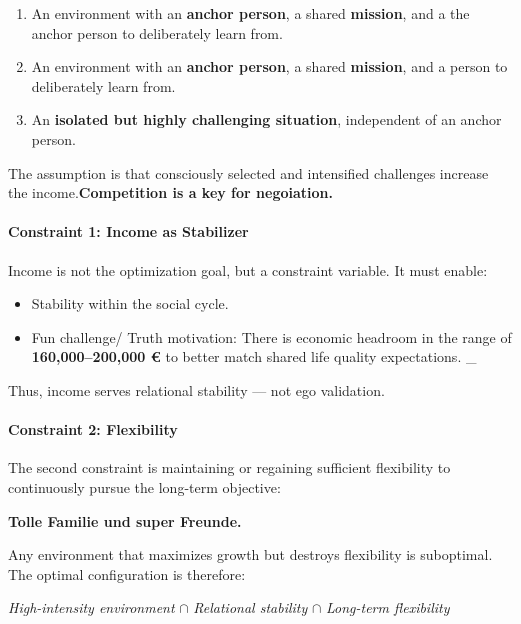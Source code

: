  \begin{enumerate}
 	\item An environment with an \textbf{anchor person}, a shared \textbf{mission}, and a the anchor person to deliberately learn from.
 	\item An environment with an \textbf{anchor person}, a shared \textbf{mission}, and a person to deliberately learn from.
 	\item An \textbf{isolated but highly challenging situation}, independent of an anchor person.
 \end{enumerate}
 
 The assumption is that consciously selected and intensified challenges increase the income.\textbf{Competition is a key for negoiation.} 
 
 \paragraph{Constraint 1: Income as Stabilizer}
 
 Income is not the optimization goal, but a constraint variable. It must enable:
 \begin{itemize}
 	\item Stability within the social cycle.
 	\item Fun challenge/ Truth motivation:  There is economic headroom in the range of \textbf{160,000–200,000 €} to better match shared life quality expectations.  _
 \end{itemize}
 
 
 Thus, income serves relational stability — not ego validation.
 
 \paragraph{Constraint 2: Flexibility}
 
 The second constraint is maintaining or regaining sufficient flexibility to continuously pursue the long-term objective:
 
 \begin{center}
 	\textbf{Tolle Familie und super Freunde.}
 \end{center}
 
 Any environment that maximizes growth but destroys flexibility is suboptimal.
 The optimal configuration is therefore:
 
 \begin{center}
 	\textit{High-intensity environment} $\cap$ \textit{Relational stability} $\cap$ \textit{Long-term flexibility}
 \end{center}
 
